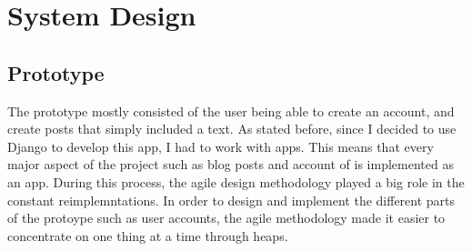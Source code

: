 
\chapter {System Design}

\section{Prototype}
The prototype mostly consisted of the user being able to create an account, and create posts that simply included a text. As stated before, since I decided to use Django to develop this app, I had to work with apps. This means that every major aspect of the project such as blog posts and account of is implemented as an app. During this process, the agile design methodology played a big role in the constant reimplemntations. In order to design and implement the different parts of the protoype such as user accounts, the agile methodology made it easier to concentrate on one thing at a time through heaps.

